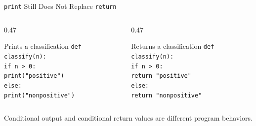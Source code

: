 \documentclass[aspectratio=169,10pt]{beamer}
\begin{document}
\begin{frame}{\texttt{print} Still Does Not Replace \texttt{return}}
  \begin{columns}[T,onlytextwidth]
    \begin{column}{0.47\textwidth}
      \begin{block}{Prints a classification}
        \texttt{def classify(n):}\\
        \hspace*{0.20in}\texttt{if n > 0:}\\
        \hspace*{0.40in}\texttt{print("positive")}\\
        \hspace*{0.20in}\texttt{else:}\\
        \hspace*{0.40in}\texttt{print("nonpositive")}
      \end{block}
    \end{column}

    \begin{column}{0.47\textwidth}
      \begin{block}{Returns a classification}
        \texttt{def classify(n):}\\
        \hspace*{0.20in}\texttt{if n > 0:}\\
        \hspace*{0.40in}\texttt{return "positive"}\\
        \hspace*{0.20in}\texttt{else:}\\
        \hspace*{0.40in}\texttt{return "nonpositive"}
      \end{block}
    \end{column}
  \end{columns}

  \begin{keyidea}
    Conditional output and conditional return values are different program behaviors.
  \end{keyidea}
\end{frame}
\end{document}

